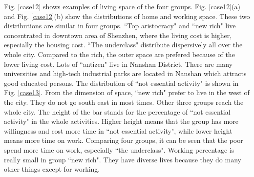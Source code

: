 Fig. \ref{case12} shows examples of living space of the four groups. Fig. \ref{case12}(a) and Fig. \ref{case12}(b) show the distributions of home and working space. These two distributions are similar in four groups. ``Top aristocracy" and ``new rich" live concentrated in downtown area of Shenzhen, where the living cost is higher, especially the housing cost. ``The underclass" distribute dispersively all over the whole city. Compared to the rich, the outer space are prefered because of the lower living cost. Lots of ``antizen" live in Nanshan District. There are many universities and high-tech industrial parks are located in Nanshan which attracts good educated persons. The distribution of ``not essential activity" is shown in Fig. \ref{case13}. From the dimension of space, ``new rich" prefer to live in the west of the city. They do not go south east in most times. Other three groups reach the whole city. The height of the bar stands for the percentage of ``not essential activity" in the whole activities. Higher height means that the group has more willingness and cost more time in ``not essential activity", while lower height means more time on work. Comparing four groups, it can be seen that the poor spend more time on work, especially ``the underclass". Working percentage is really small in group ``new rich". They have diverse lives because they do many other things except for working.


